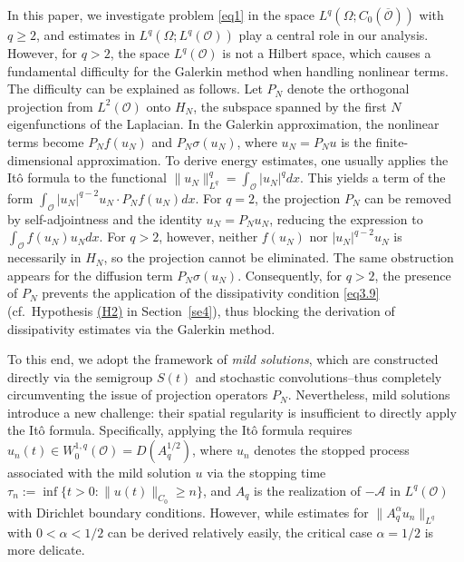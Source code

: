 \documentclass[10pt]{article}
\numberwithin{figure}{section}
\numberwithin{equation}{section}
\newcommand{\0}{{\theta}}
\begin{document}
In this paper, we investigate problem \eqref{eq1} in the space $L^q(\Omega; C_0(\overline{\mathcal{O}}))$ with $q\ge 2$, and estimates in $L^q(\Omega; L^q(\mathcal{O}))$ play a central role in our analysis. However, for $q>2$, the space $L^q(\mathcal{O})$ is not a Hilbert space, which causes a fundamental difficulty for the Galerkin method when handling nonlinear terms.
The difficulty can be explained as follows. Let $P_N$ denote the orthogonal projection from $L^2(\mathcal{O})$ onto $H_N$, the subspace spanned by the first $N$ eigenfunctions of the Laplacian. In the Galerkin approximation, the nonlinear terms become $P_N f(u_N)$ and $P_N \sigma(u_N)$, where $u_N = P_N u$ is the finite-dimensional approximation. To derive energy estimates, one usually applies the It\^o formula to the functional $\|u_N\|_{L^q}^q = \int_{\mathcal{O}} |u_N|^q dx$. This yields a term of the form
$
\int_{\mathcal{O}} |u_N|^{q-2} u_N \cdot P_N f(u_N) dx
$.
For $q=2$, the projection $P_N$ can be removed by self-adjointness and the identity $u_N = P_N u_N$, reducing the expression to $\int_{\mathcal{O}} f(u_N) u_N dx$. For $q>2$, however, neither $f(u_N)$ nor $|u_N|^{q-2} u_N$ is necessarily in $H_N$, so the projection cannot be eliminated. The same obstruction appears for the diffusion term $P_N \sigma(u_N)$. Consequently, for $q>2$, the presence of $P_N$ prevents the application of the dissipativity condition \eqref{eq3.9} (cf.\ Hypothesis \hyperref[H2]{(H2)} in Section~\ref{se4}), thus blocking the derivation of dissipativity estimates via the Galerkin method.

To this end, we adopt the framework of {\sl mild solutions}, which are constructed directly via the semigroup $S(t)$ and stochastic convolutions--thus completely circumventing the issue of projection operators $P_N$. Nevertheless, mild solutions introduce a new challenge: their spatial regularity is insufficient to directly apply the It\^{o} formula.
Specifically, applying the It\^{o} formula requires $u_n(t) \in W_0^{1,q}(\mathcal{O}) = D(A_q^{1/2})$, where $u_n$ denotes the stopped process associated with the mild solution $u$ via the stopping time $\tau_n := \inf\{t > 0 : \|u(t)\|_{C_0} \geq n\}$, and $A_q$ is the realization of $-\mathcal{A}$ in $L^q(\mathcal{O})$ with Dirichlet boundary conditions. However, while estimates for $\|A_q^\alpha u_n\|_{L^q}$ with $0 < \alpha < 1/2$ can be derived relatively easily, the critical case $\alpha = 1/2$ is more delicate.
\end{document}

